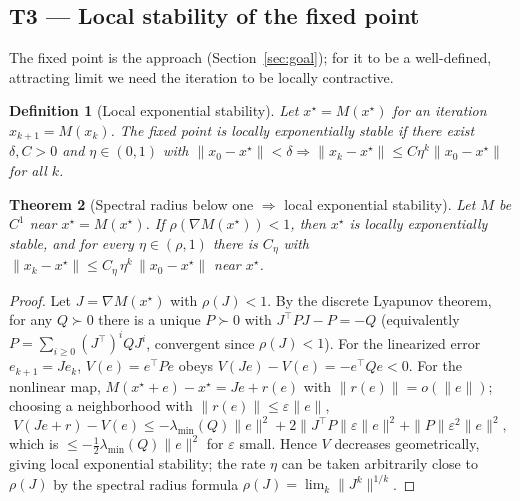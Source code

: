 \documentclass[11pt]{article}
\newtheorem{theorem}{Theorem}[section]
\newtheorem{definition}[theorem]{Definition}
\begin{document}
\subsection{T3 --- Local stability of the fixed point}
\label{sec:t3}

The fixed point is the approach (Section~\ref{sec:goal}); for it to be a well-defined,
attracting limit we need the iteration to be locally contractive.

\begin{definition}[Local exponential stability]
\label{def:stable}
Let $x^\star=M(x^\star)$ for an iteration $x_{k+1}=M(x_k)$.  The fixed point is locally
exponentially stable if there exist $\delta,C>0$ and $\eta\in(0,1)$ with
$\|x_0-x^\star\|<\delta \Rightarrow \|x_k-x^\star\|\le C\eta^k\|x_0-x^\star\|$ for all $k$.
\end{definition}

\begin{theorem}[Spectral radius below one $\Rightarrow$ local exponential stability]
\label{thm:lyap}
Let $M$ be $C^1$ near $x^\star=M(x^\star)$.  If $\rho(\nabla M(x^\star))<1$, then $x^\star$
is locally exponentially stable, and for every $\eta\in(\rho,1)$ there is $C_\eta$ with
$\|x_k-x^\star\|\le C_\eta\,\eta^k\,\|x_0-x^\star\|$ near $x^\star$.
\end{theorem}

\begin{proof}
Let $J=\nabla M(x^\star)$ with $\rho(J)<1$.  By the discrete Lyapunov theorem, for any
$Q\succ0$ there is a unique $P\succ0$ with $J^\top P J - P = -Q$ (equivalently
$P=\sum_{i\ge0}(J^\top)^i Q J^i$, convergent since $\rho(J)<1$).  For the linearized error
$e_{k+1}=Je_k$, $V(e)=e^\top Pe$ obeys $V(Je)-V(e)=-e^\top Qe<0$.  For the nonlinear map,
$M(x^\star+e)-x^\star = Je+r(e)$ with $\|r(e)\|=o(\|e\|)$; choosing a neighborhood with
$\|r(e)\|\le\varepsilon\|e\|$,
\[
  V(Je+r)-V(e) \le -\lambda_{\min}(Q)\|e\|^2 + 2\|J^\top P\|\varepsilon\|e\|^2 + \|P\|\varepsilon^2\|e\|^2,
\]
which is $\le-\tfrac12\lambda_{\min}(Q)\|e\|^2$ for $\varepsilon$ small.  Hence $V$
decreases geometrically, giving local exponential stability; the rate $\eta$ can be taken
arbitrarily close to $\rho(J)$ by the spectral radius formula
$\rho(J)=\lim_k\|J^k\|^{1/k}$.
\end{proof}
\end{document}
